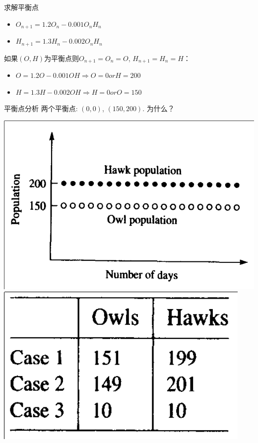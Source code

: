 \documentclass{beamer}
\begin{document}
\begin{frame}{求解平衡点}
  \begin{definition}
    \begin{itemize}
    \item $O_{n+1}=1.2O_n - 0.001O_nH_n$
    \item $H_{n+1}=1.3H_n - 0.002O_nH_n$
    \end{itemize}
  \end{definition}

  如果$(O,H)$为平衡点则$O_{n+1}=O_n=O$, $H_{n+1}=H_n=H$：

  \begin{itemize}
  \item $O=1.2O - 0.001OH \Rightarrow O = 0 or H = 200$ 
  \item $H=1.3H - 0.002OH \Rightarrow H = 0 or O = 150$
  \end{itemize}

\end{frame}

\begin{frame}{平衡点分析}
  两个平衡点: $(0, 0)$, $(150, 200)$. 为什么？

  \begin{center}
    \includegraphics[width=.4\textwidth{}]{owl.png}
    \includegraphics[height=.2\textwidth{}]{owl-start.png}
  \end{center}  

\end{frame}
\end{document}
